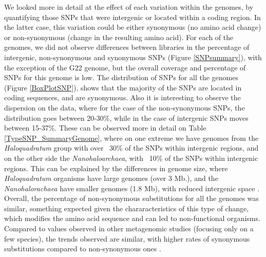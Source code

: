 We looked more in detail at the effect of each variation within the genomes, by quantifying those SNPs that were intergenic or located within a coding region. In the latter case, this variation could be either synonymous (no amino acid change) or non-synonymous (change in the resulting amino acid). For each of the genomes, we did not observe differences between libraries in the percentage of intergenic, non-synonymous and synonymous SNPs (Figure \ref{SNPsummary}), with the exception of the G22 genome, but the overall coverage and percentage of SNPs for this genome is low. The distribution of SNPs for all the genomes (Figure \ref{BoxPlotSNP}), shows that the majority of the SNPs are located in coding sequences, and are synonymous. Also it is interesting to observe the dispersion on the data, where for the case of the non-synonymous SNPs, the distribution goes between 20-30\%, while in the case of intergenic SNPs moves between 15-37\%. These can be observed more in detail on Table \ref{TypeSNP_SummaryGenome}, where on one extreme we have genomes from the \textit{Haloquadratum} group with over ~30\% of the SNPs within intergenic regions, and on the other side the \textit{Nanohaloarchaea}, with ~10\% of the SNPs within intergenic regions. This can be explained by the differences in genome size, where \textit{Haloquadratum} organisms have large genomes (over 3 Mb.), and the \textit{Nanohalorachaea} have smaller genomes (1.8 Mb), with reduced intergenic space \cite{Narasingarao:2012kp,Podell:2013kx}. Overall, the percentage of non-synonymous substitutions for all the genomes was similar, something expected given the chararacteristics of this type of change, which modifies the amino acid sequence and can led to non-functional organisms. Compared to values observed in other metagenomic studies (focusing only on a few species), the trends observed are similar, with higher rates of synonymous substitutions compared to non-synonymous ones \cite{Simmons:2008by}.

